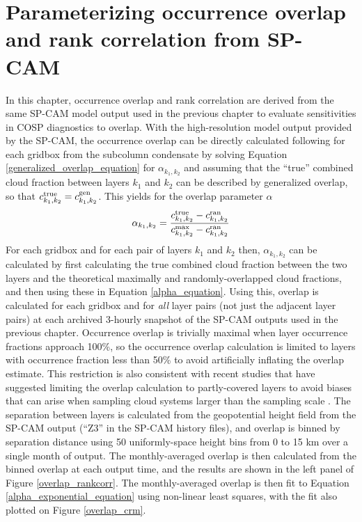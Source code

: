 \section{Parameterizing occurrence overlap and rank correlation from SP-CAM}
In this chapter, occurrence overlap and rank correlation are derived from the same SP-CAM model output used in the previous chapter to evaluate sensitivities in COSP diagnostics to overlap. With the high-resolution model output provided by the SP-CAM, the occurrence overlap can be directly calculated following \cite{pincus_et_al_2005} for each gridbox from the subcolumn condensate by solving Equation \ref{generalized_overlap_equation} for $\alpha_{k_1, k_2}$ and assuming that the ``true'' combined cloud fraction between layers $k_1$ and $k_2$ can be described by generalized overlap, so that $c^{\rm true}_{k_1, k_2} = c^{\rm gen}_{k_1, k_2}$. This yields for the overlap parameter $\alpha$
\begin{gather}
    \alpha_{k_1, k_2} = \frac{
        c^{\rm true}_{k_1, k_2} - c^{\rm ran}_{k_1, k_2}
    }{
        c^{\rm max}_{k_1, k_2} - c^{\rm ran}_{k_1, k_2}
    }
    \label{alpha_equation}
\end{gather}
For each gridbox and for each pair of layers $k_1$ and $k_2$ then, $\alpha_{k_1, k_2}$ can be calculated by first calculating the true combined cloud fraction between the two layers and the theoretical maximally and randomly-overlapped cloud fractions, and then using these in Equation \ref{alpha_equation}. Using this, overlap is calculated for each gridbox and for \emph{all} layer pairs (not just the adjacent layer pairs) at each archived 3-hourly snapshot of the SP-CAM outputs used in the previous chapter. Occurrence overlap is trivially maximal when layer occurrence fractions approach 100\%, so the occurrence overlap calculation is limited to layers with occurrence fraction less than 50\% to avoid artificially inflating the overlap estimate. This restriction is also consistent with recent studies that have suggested limiting the overlap calculation to partly-covered layers to avoid biases that can arise when sampling cloud systems larger than the sampling scale \citep[e.g.,][]{tompkins_and_digiuseppe_2015}. The separation between layers is calculated from the geopotential height field from the SP-CAM output (``Z3'' in the SP-CAM history files), and overlap is binned by separation distance using 50 uniformly-space height bins from 0 to 15 km over a single month of output. The monthly-averaged overlap is then calculated from the binned overlap at each output time, and the results are shown in the left panel of Figure \ref{overlap_rankcorr}. The monthly-averaged overlap is then fit to Equation \ref{alpha_exponential_equation} using non-linear least squares, with the fit also plotted on Figure \ref{overlap_crm}. 

